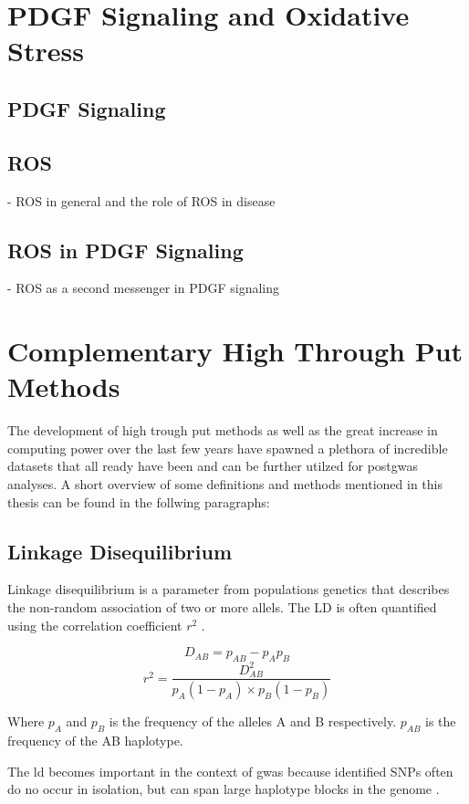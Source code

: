 \section{PDGF Signaling and Oxidative Stress}
\label{sec:haosms}
    \subsection{PDGF Signaling}
    \label{subsec:pdf_signaling}

    \subsection{ROS}
    \label{subsec:ROS}
    - ROS in general and the role of ROS in disease

    \subsection{ROS in PDGF Signaling}
    \label{subsec:ROS_signaling}
    - ROS as a second messenger in PDGF signaling

\section{Complementary High Through Put Methods}
\label{sec:bioinformatics}
The development of high trough put methods as well as the great increase in computing power over the last few years have spawned a plethora of incredible datasets that all ready have been and can be further utilzed for post\ac{gwas} analyses. A short overview of some definitions and methods mentioned in this thesis can be found in the follwing paragraphs:

    \subsection{Linkage Disequilibrium}
    Linkage disequilibrium is a parameter from populations genetics that describes the non-random association of two or more allels. The LD is often quantified using the correlation coefficient $r^2$ \cite{slatkinLinkageDisequilibriumUnderstanding2008}.

    $$ D_{AB} = p_{AB} − p_A p_B $$
    $$ r^2 = \frac{D_{AB}^2}{p_A (1-p_A) \times p_B (1-p_B)} $$

    Where $p_A$ and $p_B$ is the frequency of the alleles A and B respectively. $p_{AB}$ is the frequency of the AB haplotype.

    The \ac{ld} becomes important in the context of \ac{gwas} because identified SNPs often do no occur in isolation, but can span large haplotype blocks in the genome \cite{slatkinLinkageDisequilibriumUnderstanding2008}.

